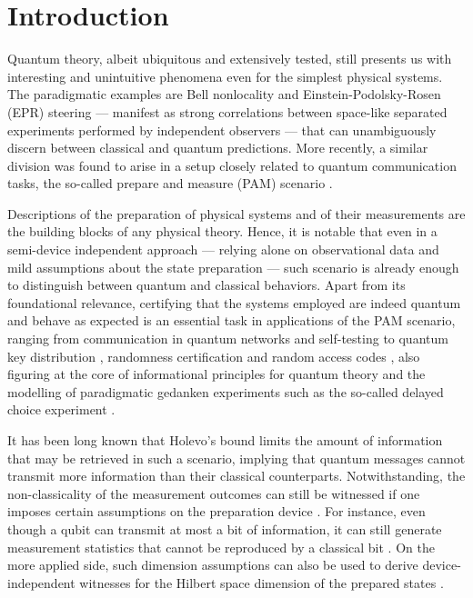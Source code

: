 \documentclass[a4paper,preprintnumbers,floatfix,superscriptaddress,pra,twocolumn,showpacs,notitlepage,longbibliography]{revtex4-2}
\begin{document}
\maketitle

\section{Introduction}

    Quantum theory, albeit ubiquitous and extensively tested, still presents us with interesting and unintuitive phenomena even for the simplest physical systems. The paradigmatic examples are Bell nonlocality \cite{bell-epr-1964, brunner-nonlocality-2014} and Einstein-Podolsky-Rosen (EPR) steering \cite{wiseman-steering-2007, cavalcanti-steering-2016, uola-steering-2020} --- manifest as strong correlations between space-like separated experiments performed by independent observers --- that can unambiguously discern between classical and quantum predictions. More recently, a similar division was found to arise in a setup closely related to quantum communication tasks, the so-called prepare and measure (PAM) scenario \cite{gallego-pam-2010}. 
    
    Descriptions of the preparation of physical systems and of their measurements are the building blocks of any physical theory.
    Hence, it is notable that even in a semi-device independent approach --- relying alone on observational data and mild assumptions about the state preparation --- such scenario is already enough to distinguish between quantum and classical behaviors. Apart from its foundational relevance, certifying that the systems employed are indeed quantum and behave as expected is an essential task in applications of the PAM scenario, ranging from communication in quantum networks \cite{bowles2015testing,wang2019characterising} and self-testing \cite{tavakoli2018self,miklin2020universal} to quantum key distribution \cite{pawlowski-qkd-2011}, randomness certification \cite{passaro-randomness-2015} and random access codes \cite{li2012semi}, also figuring at the core of informational principles for quantum theory \cite{pawlowski2009information,chaves2015information} and the modelling of paradigmatic gedanken experiments such as the so-called delayed choice experiment \cite{chaves2018causal}.
    
    It has been long known that Holevo's bound \cite{holevo-bound-1973} limits the amount of information that may be retrieved in such a scenario, implying that quantum messages cannot transmit more information than their classical counterparts. Notwithstanding, the non-classicality of the measurement outcomes can still be witnessed if one imposes certain assumptions on the preparation device \cite{gallego-pam-2010,bowles2014certifying,chaves2015device,van2017semi,tavakoli2020informationally,Poderini2020}. For instance, even though a qubit can transmit at most a bit of information, it can still generate measurement statistics that cannot be reproduced by a classical bit \cite{gallego-pam-2010,bowles2014certifying}. On the more applied side, such dimension assumptions can also be used to derive device-independent witnesses for the Hilbert space dimension of the prepared states \cite{brunner2013dimension,George2020}. 
\end{document}
